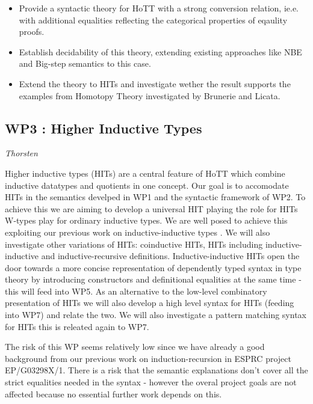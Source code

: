 \documentclass[twocolumn,a4paper,11pt]{article}
\begin{document}
\begin{itemize}

\item Provide a syntactic theory for HoTT with a strong conversion
  relation, ie.e. with additional equalities reflecting the
  categorical properties of eqaulity proofs.

\item Establish decidability of this theory, extending existing
  approaches like NBE and Big-step semantics to this case.

\item Extend the theory to HITs and investigate wether the 
  result supports the examples from Homotopy Theory investigated by
  Brunerie and Licata.

\end{itemize}

\subsection*{WP3 : Higher Inductive Types}

\emph{Thorsten}

Higher inductive types (HITs) are a central feature of HoTT which combine
inductive datatypes and quotients in one concept. Our goal is to
accomodate HITs in the semantics develped in WP1 and the syntactic
framework of WP2. To achieve this we are aiming to develop a universal
HIT playing the role for HITs W-types play for ordinary inductive
types. We are well posed to achieve this exploiting our previous work on
inductive-inductive types \cite{txa:catind2}. We will also investigate
other variations of HITs: coinductive HITs, HITs including
inductive-inductive and inductive-recursive
definitions. Inductive-inductive HITs open the door towards a more
concise representation of dependently typed syntax in type theory
\cite{chapman2009type} by
introducing constructors and definitional equalities at the same time
- this will feed into WP5. As an alternative to the low-level
combinatory presentation of HITs we will also develop a high level
syntax for HITs (feeding into WP7) and relate the two. We will also
investigate a pattern matching syntax for HITs this is releated again
to WP7.

The risk of this WP seems relatively low since we have already a good
background from our previous work on induction-recursion in ESPRC
project EP/G03298X/1. There is a risk that the semantic explanations
don't cover all the strict equalities needed in the syntax - however
the overal project goals are not affected because no essential further
work depends on this.
\end{document}
